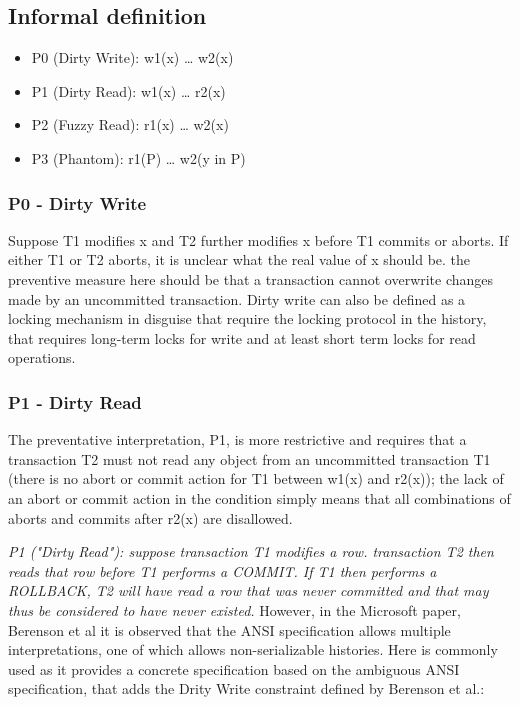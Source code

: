 \documentclass[a4paper,10pt,titlepage]{report}
\begin{document}
\subsection{Informal definition}

\begin{itemize}
    \item P0 (Dirty Write): w1(x) … w2(x)
    \item P1 (Dirty Read): w1(x) … r2(x)
    \item P2 (Fuzzy Read): r1(x) … w2(x)
    \item P3 (Phantom): r1(P) … w2(y in P)
\end{itemize}

    \subsubsection{P0 - Dirty Write}
        Suppose T1 modifies x and T2 further modifies x before T1 commits or aborts. If either T1 or T2 aborts, it is unclear what the real value of x should be. the preventive measure here should be that a transaction cannot overwrite changes made by an uncommitted transaction. Dirty write can also be defined as a locking mechanism in disguise that require the locking protocol in the history, that requires long-term locks for write and at least short term locks for read operations.


    \subsubsection{P1 - Dirty Read}
        The preventative interpretation, P1, is more restrictive and requires that a transaction T2 must not read any object from an uncommitted transaction T1 (there is no abort or commit action for T1 between w1(x) and r2(x)); the lack of an abort or commit action in the condition simply means that all combinations of aborts and commits after r2(x) are disallowed.


    \textit{P1 ("Dirty Read"): suppose transaction T1 modifies a row. transaction T2 then reads that row before T1 performs a COMMIT. If T1 then performs a ROLLBACK, T2 will have read a row that was never committed and that may thus be considered to have never existed.} However, in the Microsoft paper, Berenson et al\cite{Berensonetal} it is observed that the ANSI specification allows multiple interpretations, one of which allows non-serializable histories. Here \cite{Adya99weakconsistency} is commonly used as it provides a concrete specification based on the ambiguous ANSI specification, that adds the Drity Write constraint defined by Berenson et al\cite{Berensonetal}.:
    
\end{document}
